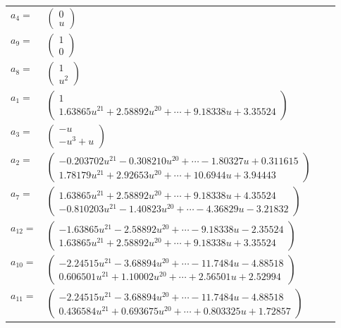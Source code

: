 \documentclass[1p]{elsarticle_modified}
\theoremstyle{definition}
\begin{document}
\begin{tabular}{m{7pt} m{180pt} m{7pt} m{180pt} }
\flushright $a_{4}=$&$\begin{pmatrix}0\\u\end{pmatrix}$ \\
\flushright $a_{9}=$&$\begin{pmatrix}1\\0\end{pmatrix}$ \\
\flushright $a_{8}=$&$\begin{pmatrix}1\\u^2\end{pmatrix}$ \\
\flushright $a_{1}=$&$\begin{pmatrix}1\\1.63865 u^{21}+2.58892 u^{20}+\cdots+9.18338 u+3.35524\end{pmatrix}$ \\
\flushright $a_{3}=$&$\begin{pmatrix}- u\\- u^3+u\end{pmatrix}$ \\
\flushright $a_{2}=$&$\begin{pmatrix}-0.203702 u^{21}-0.308210 u^{20}+\cdots-1.80327 u+0.311615\\1.78179 u^{21}+2.92653 u^{20}+\cdots+10.6944 u+3.94443\end{pmatrix}$ \\
\flushright $a_{7}=$&$\begin{pmatrix}1.63865 u^{21}+2.58892 u^{20}+\cdots+9.18338 u+4.35524\\-0.810203 u^{21}-1.40823 u^{20}+\cdots-4.36829 u-3.21832\end{pmatrix}$ \\
\flushright $a_{12}=$&$\begin{pmatrix}-1.63865 u^{21}-2.58892 u^{20}+\cdots-9.18338 u-2.35524\\1.63865 u^{21}+2.58892 u^{20}+\cdots+9.18338 u+3.35524\end{pmatrix}$ \\
\flushright $a_{10}=$&$\begin{pmatrix}-2.24515 u^{21}-3.68894 u^{20}+\cdots-11.7484 u-4.88518\\0.606501 u^{21}+1.10002 u^{20}+\cdots+2.56501 u+2.52994\end{pmatrix}$ \\
\flushright $a_{11}=$&$\begin{pmatrix}-2.24515 u^{21}-3.68894 u^{20}+\cdots-11.7484 u-4.88518\\0.436584 u^{21}+0.693675 u^{20}+\cdots+0.803325 u+1.72857\end{pmatrix}$ \\

\end{tabular}
\end{document}
